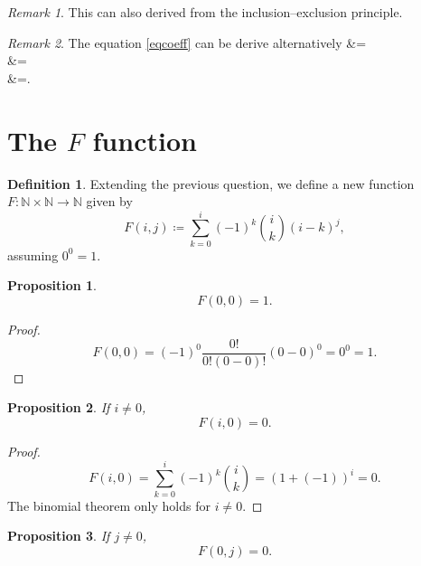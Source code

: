 \documentclass[12pt, letterpaper]{article}
\newcommand{\nat}{\mathbb{N}}
\newcommand{\define}{\coloneqq}
\newenvironment{eqlong}{\equation\aligned}{\endaligned\endequation}
\newtheorem{prop}{Proposition}[section]
\theoremstyle{definition}
\newtheorem*{def*}{Definition}
\theoremstyle{remark}
\newtheorem*{rem*}{Remark}
\begin{document}
	\begin{rem*}
		This can also derived from the inclusion--exclusion principle.
	\end{rem*}

	\begin{rem*}
		The equation \eqref{eqcoeff} can be derive alternatively
		\begin{eqlong}
			&=\\
			&=\\
			&=.\\
		\end{eqlong}
	\end{rem*}

	\section{The $F$ function}
	\begin{def*}
		Extending the previous question, we define a new function $F\colon \nat\times\nat \to \nat$ given by
			\begin{equation}\label{eqFijNat}
				F(i,j)\define\sum_{k=0}^{i}(-1)^k\binom{i}{k}\left(i-k\right)^j,
			\end{equation}
			assuming $0^0=1$.
	\end{def*}
	\begin{prop}
		\begin{equation}\label{eqF00}
			F(0,0)=1.
		\end{equation}
	\end{prop}
	\begin{proof}
		\[F(0,0)=(-1)^0\frac{0!}{0!(0-0)!}(0-0)^0=0^0=1.\]
	\end{proof}
	\begin{prop}
		If $i\ne0$,
		\begin{equation}\label{eqFi0}
			F(i,0)=0.
		\end{equation}
	\end{prop}
	\begin{proof}
		\[F(i,0)=\sum_{k=0}^i (-1)^k \binom{i}{k}=(1+(-1))^i=0.\]
		The binomial theorem only holds for $i\ne0$.
	\end{proof}
	\begin{prop}
		If $j\ne0$,
		\begin{equation}\label{eqF0j}
			F(0,j)=0.
		\end{equation}
	\end{prop}
\end{document}
